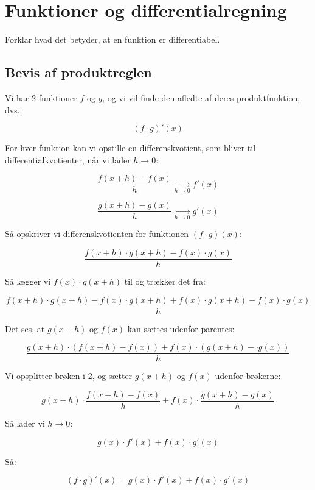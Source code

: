 
\section{Funktioner og differentialregning}

Forklar hvad det betyder, at en funktion er differentiabel. 

\subsection{Bevis af produktreglen}

\begin{proofw}
    

Vi har 2 funktioner $f$ og $g$, og vi vil finde den afledte af deres produktfunktion, dvs.:

$$
    (f\cdot g)'(x)
$$

For hver funktion kan vi opstille en differenskvotient, som bliver til differentialkvotienter, når vi lader $h \rightarrow 0$:

$$
    \frac{f(x+h)-f(x)}{h} \xrightarrow[h \rightarrow 0]{} f'(x)
$$

$$
    \frac{g(x+h)-g(x)}{h} \xrightarrow[h \rightarrow 0]{} g'(x)
$$

Så opskriver vi differenskvotienten for funktionen $(f \cdot g)(x)$:

$$
    \frac{
        f(x+h)\cdot g(x+h)
        -
        f(x) \cdot g(x)
    }{h}
$$

Så lægger vi $f(x) \cdot g(x+h)$ til og trækker det fra:

$$
    \frac{
        f(x+h)\cdot g(x+h)
        -
        f(x) \cdot g(x+h)
        +
        f(x) \cdot g(x+h)
        -
        f(x) \cdot g(x)
    }{h}
$$

Det ses, at $g(x+h)$ og $f(x)$ kan sættes udenfor parentes:

$$
    \frac{
        g(x+h) \cdot (f(x+h)
        -
        f(x))
        +
        f(x) \cdot (g(x+h)
        -
     \cdot g(x))
    }{h}
$$

Vi opsplitter brøken i 2, og sætter $g(x+h)$ og $f(x)$ udenfor brøkerne:

$$
    g(x+h) \cdot \frac{
          f(x+h)
        -
        f(x)   
    }{h}
    +
        f(x) \cdot 
        \frac{g(x+h)
        -
      g(x)}{h}
$$

Så lader vi $h \rightarrow 0$:

$$
    g(x) \cdot f'(x)+f(x) \cdot g'(x)
$$

Så:

$$
    (f \cdot g)'(x)=    g(x) \cdot f'(x)+f(x) \cdot g'(x)
$$

\end{proofw}
